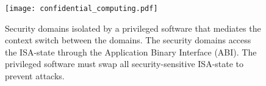 \begin{figure}
    \centering
    \texttt{[image: confidential\_computing.pdf]}
    \caption{Security domains isolated by a privileged software that mediates the context switch between the domains. 
    The security domains access the ISA-state through the Application Binary Interface (ABI). The privileged software must swap all security-sensitive ISA-state to prevent attacks.} 
    \label{fig:conf-comp}
\end{figure}
